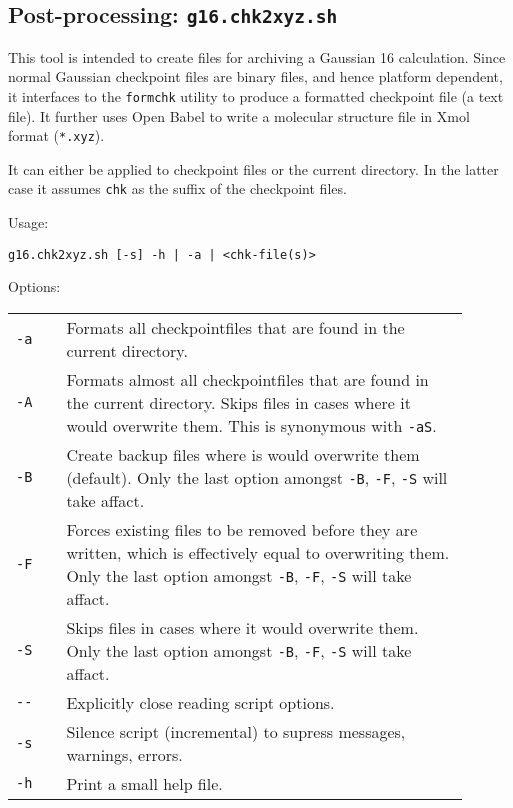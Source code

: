 \documentclass[   %
  final,          %
  a4paper         %
]{article}
\begin{document}
\subsection{Post-processing: \texorpdfstring{{\lstinline`g16.chk2xyz.sh`}}{g16.chk2xyz.sh}}
\label{sec:g16.chk2xyz}

This tool is intended to create files for archiving a Gaussian 16 calculation.
Since normal Gaussian checkpoint files are binary files, and hence platform dependent,
it interfaces to the \texttt{formchk} utility to produce a formatted checkpoint file (a text file).
It further uses Open Babel to write a molecular structure file in Xmol format (\texttt{*.xyz}).

It can either be applied to checkpoint files or the current directory.
In the latter case it assumes \texttt{chk} as the suffix of the checkpoint files.

Usage: 

\lstinline`g16.chk2xyz.sh [-s] -h | -a | <chk-file(s)>`

Options:

\begin{tabular}{p{0.1\linewidth}p{0.8\linewidth}}
  {\lstinline`-a`}       & Formats all checkpointfiles that are found in the current directory. \\
  {\lstinline`-A`}       & Formats almost all checkpointfiles that are found in the current directory. 
    Skips files in cases where it would overwrite them.
    This is synonymous with \lstinline`-aS`.\\
  {\lstinline`-B`}       & Create backup files where is would overwrite them (default). 
    Only the last option amongst \lstinline`-B`, \lstinline`-F`, \lstinline`-S` will take affact.\\
  {\lstinline`-F`}       & Forces existing files to be removed before they are written, 
    which is effectively equal to overwriting them.
    Only the last option amongst \lstinline`-B`, \lstinline`-F`, \lstinline`-S` will take affact.\\
  {\lstinline`-S`}       & Skips files in cases where it would overwrite them.
    Only the last option amongst \lstinline`-B`, \lstinline`-F`, \lstinline`-S` will take affact.\\
  {\lstinline`--`}       & Explicitly close reading script options. \\
  {\lstinline`-s`}       & Silence script (incremental) to supress messages, warnings, errors. \\
  {\lstinline`-h`}       & Print a small help file. \\
\end{tabular}
\end{document}
